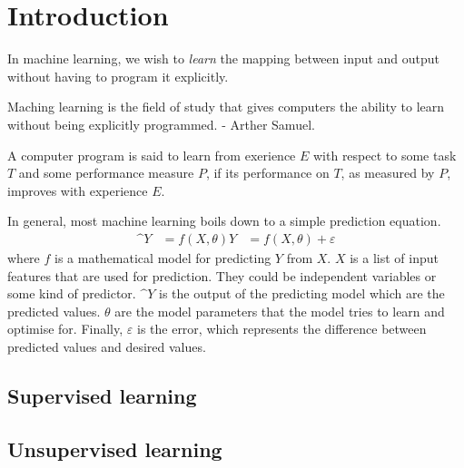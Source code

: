 \documentclass[CS5104-Notes.tex]{subfiles}
\begin{document}
\section{Introduction}
In machine learning, we wish to \textit{learn} the mapping between input and output without having to program it explicitly.

\begin{displayquote}
Maching learning is the field of study that gives computers the ability to learn without being explicitly programmed. - Arther Samuel.
\end{displayquote}

\begin{displayquote}
A computer program is said to learn from exerience $E$ with respect to some task $T$ and some performance measure $P$, if its performance on $T$, as measured by $P$, improves with experience $E$.
\end{displayquote}
\noindent
In general, most machine learning boils down to a simple prediction equation.
\begin{align}
  \^{Y} &= f(X, \theta)
  Y &= f(X, \theta) + \varepsilon
\end{align}
where $f$ is a mathematical model for predicting $Y$ from $X$. $X$ is a list of input features that are used for prediction. They could be independent variables or some kind of predictor. $\^{Y}$ is the output of the predicting model which are the predicted values. $\theta$ are the model parameters that the model tries to learn and optimise for. Finally, $\varepsilon$ is the error, which represents the difference between predicted values and desired values. 

\subsection{Supervised learning}

\subsection{Unsupervised learning}
\end{document}
